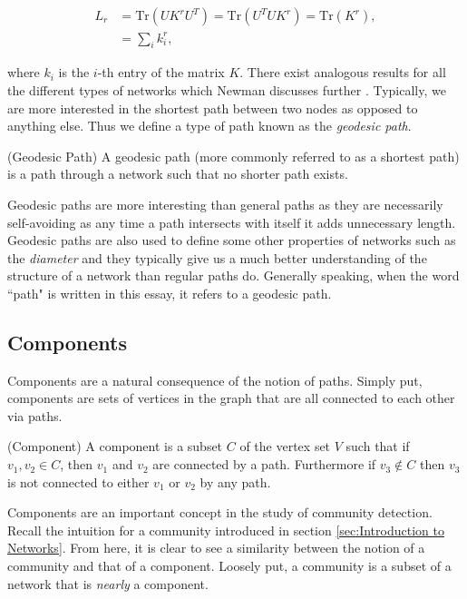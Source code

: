 $$
\begin{aligned}
    L_r &= \text{Tr}(UK^rU^T) = \text{Tr}(U^TUK^r) = \text{Tr}(K^r), \\
    & = \sum_i k_i^r,
\end{aligned}
$$

\noindent
where $k_i$ is the $i$-th entry of the matrix $K$. There exist analogous results for all the different types of networks which Newman discusses further \cite[p. 138]{newman10}. Typically, we are more interested in the shortest path between two nodes as opposed to anything else. Thus we define a type of path known as the \emph{geodesic path}.

\begin{definition}{(Geodesic Path)}
    A geodesic path (more commonly referred to as a shortest path) is a path through a network such that no shorter path exists.
\end{definition}

Geodesic paths are more interesting than general paths as they are necessarily self-avoiding as any time a path intersects with itself it adds unnecessary length. Geodesic paths are also used to define some other properties of networks such as the \emph{diameter} and they typically give us a much better understanding of the structure of a network than regular paths do. Generally speaking, when the word ``path" is written in this essay, it refers to a geodesic path.

\subsection{Components}
Components are a natural consequence of the notion of paths. Simply put, components are sets of vertices in the graph that are all connected to each other via paths.

\begin{definition}{(Component)}
    A component is a subset $C$ of the vertex set $V$ such that if $v_1, v_2 \in C$, then $v_1$ and $v_2$ are connected by a path. Furthermore if $v_3 \not\in C$ then $v_3$ is not connected to either $v_1$ or $v_2$ by any path.
\end{definition}

Components are an important concept in the study of community detection. Recall the intuition for a community introduced in section \ref{sec:Introduction to Networks}. From here, it is clear to see a similarity between the notion of a community and that of a component. Loosely put, a community is a subset of a network that is \emph{nearly} a component.

